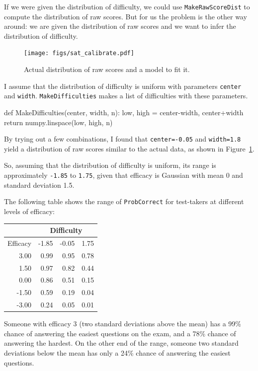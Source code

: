 \documentclass[12pt]{book}
\theoremstyle{exercise}
\newcommand{\py}[1]{{\tt #1}}%
\begin{document}
If we were given the distribution of difficulty, we could use
\verb"MakeRawScoreDist" to compute the distribution of raw scores.
But for us the problem is the other way around: we are given the
distribution of raw scores and we want to infer the distribution of
difficulty.

\begin{figure}
\centerline{\texttt{[image: figs/sat\_calibrate.pdf]}}
\caption{Actual distribution of raw scores and a model to fit it.}
\label{fig.satcalibrate}
\end{figure}

I assume that the distribution of difficulty is uniform with
parameters \py{center} and \py{width}.  \py{MakeDifficulties}
makes a list of difficulties with these parameters.

\begin{code}
def MakeDifficulties(center, width, n):
    low, high = center-width, center+width
    return numpy.linspace(low, high, n)
\end{code}

By trying out a few combinations, I found that
\py{center=-0.05} and \py{width=1.8} yield a distribution
of raw scores similar to the actual data, as shown in
Figure~\ref{fig.satcalibrate}.

So, assuming that the distribution of difficulty is uniform,
its range is approximately
\py{-1.85} to \py{1.75}, given that
efficacy is Gaussian with mean 0 and standard deviation 1.5.

The following table shows the range of \py{ProbCorrect} for
test-takers at different levels of efficacy:

\begin{tabular}{|r|r|r|r|}
\hline
           & \multicolumn{3}{|c|}{Difficulty} \\
\hline
Efficacy   & -1.85   &   -0.05   &      1.75  \\
\hline
3.00 &  0.99 &  0.95 &  0.78   \\
1.50 &  0.97 &  0.82 &  0.44   \\
0.00 &  0.86 &  0.51 &  0.15   \\
-1.50 &  0.59 &  0.19 &  0.04   \\
-3.00 &  0.24 &  0.05 &  0.01   \\
\hline
\end{tabular}

Someone with efficacy 3 (two standard deviations above
the mean) has a 99\% chance of answering the easiest questions on
the exam, and a 78\% chance of answering the hardest.  On the other
end of the range, someone two standard deviations below the mean
has only a 24\% chance of answering the easiest questions.
\end{document}
